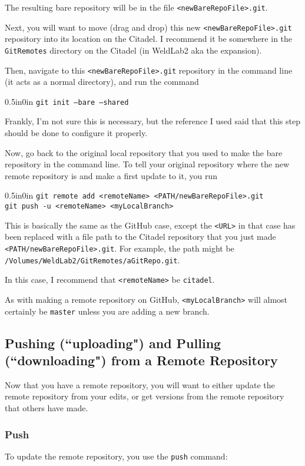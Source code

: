 \documentclass[11pt]{article}
\newcommand{\code}[1]{\begin{adjustwidth}{0.5in}{0in}
    \texttt{#1}
    \end{adjustwidth}}
\begin{document}
The resulting bare repository will be in the file \texttt{<newBareRepoFile>.git}.

Next, you will want to move (drag and drop) this new \texttt{<newBareRepoFile>.git} repository into its location on the Citadel.  I recommend it be somewhere in the \texttt{GitRemotes} directory on the Citadel (in WeldLab2 aka the expansion).

Then, navigate to this \texttt{<newBareRepoFile>.git} repository in the command line (it acts as a normal directory), and run the command

\code{git init --bare --shared}

Frankly, I'm not sure this is necessary, but the reference I used said that this step should be done to configure it properly.

Now, go back to the original local repository that you used to make the bare repository in the command line.  To tell your original repository where the new remote repository is and make a first update to it, you run

\code{git remote add <remoteName> <PATH/newBareRepoFile>.git\\
git push -u <remoteName> <myLocalBranch>}  

This is basically the same as the GitHub case, except the \texttt{<URL>} in that case has been replaced with a file path to the Citadel repository that you just made \texttt{<PATH/newBareRepoFile>.git}.  For example, the path might be \texttt{/Volumes/WeldLab2/GitRemotes/aGitRepo.git}.

In this case, I recommend that \texttt{<remoteName>} be \texttt{citadel}.

As with making a remote repository on GitHub, \texttt{<myLocalBranch>} will almost certainly be \texttt{master} unless you are adding a new branch.

\subsection{Pushing (``uploading") and Pulling (``downloading") from a Remote Repository}
\label{sec:PushPull}

Now that you have a remote repository, you will want to either update the remote repository from your edits, or get versions from the remote repository that others have made.

\subsubsection{Push}
To update the remote repository, you use the \texttt{push} command:
\end{document}
